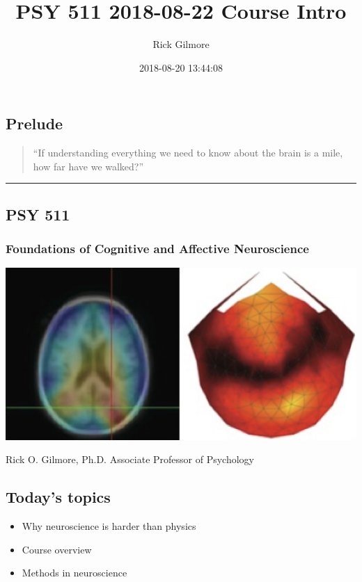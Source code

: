 \documentclass[]{article}
\title{PSY 511 2018-08-22 Course Intro}
\author{Rick Gilmore}
\date{2018-08-20 13:44:08}
\providecommand{\tightlist}{%
  \setlength{\itemsep}{0pt}\setlength{\parskip}{0pt}}
\begin{document}
\maketitle

{
\setcounter{tocdepth}{1}
\tableofcontents
}
\subsection{Prelude}\label{prelude}

\begin{quote}
``If understanding everything we need to know about the brain is a mile,
how far have we walked?''
\end{quote}

\begin{center}\rule{0.5\linewidth}{\linethickness}\end{center}

\subsection{PSY 511}\label{psy-511}

\subsubsection{Foundations of Cognitive and Affective
Neuroscience}\label{foundations-of-cognitive-and-affective-neuroscience}

\includegraphics[width=6.11in]{img/fesi-source}

Rick O. Gilmore, Ph.D. Associate Professor of Psychology

\subsection{Today's topics}\label{todays-topics}

\begin{itemize}
\tightlist
\item
  Why neuroscience is harder than physics
\item
  Course overview
\item
  Methods in neuroscience
\end{itemize}
\end{document}

